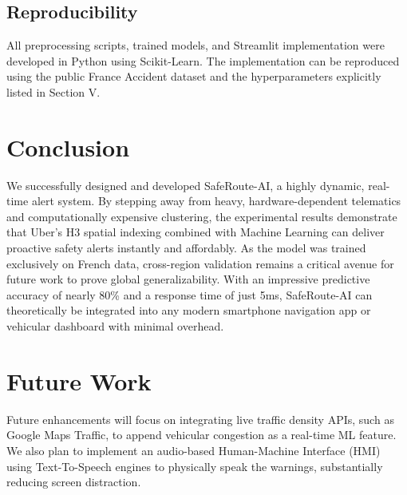 \documentclass[conference]{IEEEtran}
\begin{document}
\subsection{Reproducibility}
All preprocessing scripts, trained models, and Streamlit implementation were developed in Python using Scikit-Learn. The implementation can be reproduced using the public France Accident dataset and the hyperparameters explicitly listed in Section V.

\section{Conclusion}

We successfully designed and developed SafeRoute-AI, a highly dynamic, real-time alert system. By stepping away from heavy, hardware-dependent telematics and computationally expensive clustering, the experimental results demonstrate that Uber's H3 spatial indexing combined with Machine Learning can deliver proactive safety alerts instantly and affordably. As the model was trained exclusively on French data, cross-region validation remains a critical avenue for future work to prove global generalizability. With an impressive predictive accuracy of nearly 80\% and a response time of just 5ms, SafeRoute-AI can theoretically be integrated into any modern smartphone navigation app or vehicular dashboard with minimal overhead.

\section*{Future Work}
Future enhancements will focus on integrating live traffic density APIs, such as Google Maps Traffic, to append vehicular congestion as a real-time ML feature. We also plan to implement an audio-based Human-Machine Interface (HMI) using Text-To-Speech engines to physically speak the warnings, substantially reducing screen distraction.
\end{document}
